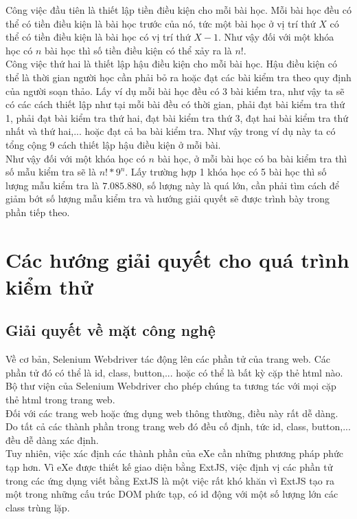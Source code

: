 Công việc đầu tiên là thiết lập tiền điều kiện cho mỗi bài học. Mỗi bài học đều có thể có tiền điều kiện là bài học trước của nó, tức một bài học ở vị trí thứ $X$ có thể có tiền điều kiện là bài học có vị trí thứ $X-1$. Như vậy đối với một khóa học có $n$ bài học thì số tiền điều kiện có thể xảy ra là $n!$.\\

Công việc thứ hai là thiết lập hậu điều kiện cho mỗi bài học. Hậu điều kiện có thể là thời gian người học cần phải bỏ ra hoặc đạt các bài kiểm tra theo quy định của người soạn thảo. Lấy ví dụ mỗi bài học đều có 3 bài kiểm tra, như vậy ta sẽ có các cách thiết lập như tại mỗi bài đều có thời gian, phải đạt bài kiểm tra thứ 1, phải đạt bài kiểm tra thứ hai, đạt bài kiểm tra thứ 3, đạt hai bài kiểm tra thứ nhất và thứ hai,... hoặc đạt cả ba bài kiểm tra. Như vậy trong ví dụ này ta có tổng cộng 9 cách thiết lập hậu điều kiện ở mỗi bài.\\

Như vậy đối với một khóa học có $n$ bài học, ở mỗi bài học có ba bài kiểm tra thì số mẫu kiểm tra sẽ là \textbf{$n! * 9^n$}. Lấy trường hợp 1 khóa học có 5 bài học thì số lượng mẫu kiểm tra là $7.085.880$, số lượng này là quá lớn, cần phải tìm cách để giảm bớt số lượng mẫu kiểm tra và hướng giải quyết sẽ được trình bày trong phần tiếp theo.\\



\section{Các hướng giải quyết cho quá trình kiểm thử}


\subsection{Giải quyết về mặt công nghệ}

Về cơ bản, Selenium Webdriver tác động lên các phần tử của trang web. Các phần tử đó có thể là id, class, button,... hoặc có thể là bất kỳ cặp thẻ html nào. Bộ thư viện của Selenium Webdriver cho phép chúng ta tương tác với mọi cặp thẻ html trong trang web.\\

Đối với các trang web hoặc ứng dụng web thông thường, điều này rất dễ dàng. Do tất cả các thành phần trong trang web đó đều cố định, tức id, class, button,... đều dễ dàng xác định.\\

Tuy nhiên, việc xác định các thành phần của eXe cần những phương pháp phức tạp hơn. Vì eXe được thiết kế giao diện bằng ExtJS, việc định vị các phần tử trong các ứng dụng viết bằng ExtJS là một việc rất khó khăn vì ExtJS tạo ra một trong những cấu trúc DOM phức tạp, có id động với một số lượng lớn các class trùng lặp.\\

